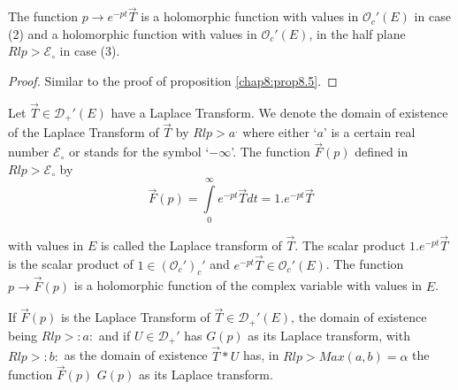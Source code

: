 \begin{prop}\label{chap9:prop9.3}
The function $p \to e^{-pt} \overrightarrow{T}$ is a holomorphic
function with values in $\mathscr{O}_c'(E)$ in case (2) and a
holomorphic function with values in $\mathscr{O}_c'(E)$, in the half
plane $Rl p > \mathscr{E}_\circ$ in case (3). 
\end{prop}

\begin{proof}
Similar to the proof of proposition \ref{chap8:prop8.5}.
\end{proof}
\setcounter{section}{9}
\setcounter{definition}{0}
\begin{definition}\label{chap9:def9.1}
Let $\overrightarrow{T} \in \mathscr{D}_+'(E)$ have a Laplace
Transform. We denote the domain of existence of the Laplace Transform
of $\overrightarrow{T}$ by $Rl p > a^.$ where either `$a$' is a
certain real number $\mathscr{E}_\circ$ or stands for the symbol
`$-\infty$'. The function $\overrightarrow{F} (p)$ defined 
in $Rl p > \mathscr{E}_\circ$ by 
$$
\overrightarrow{F}(p)=\int\limits_0^\infty e^{-pt} \overrightarrow{T}
dt = 1.e^{-pt}\overrightarrow{T}
$$
\end{definition}
with values in $E$ is called the Laplace transform of
$\overrightarrow{T}$. The scalar product $1.e^{-pt}
\overrightarrow{T}$ is the scalar product of $1 \in
(\mathscr{O}_c')_c'$ and $e^{-pt} \overrightarrow{T} \in
\mathscr{O}_c'(E)$. The function $p \to \overrightarrow{F}(p)$ is a
holomorphic function of the complex variable with values in $E$.

\begin{prop}\label{chap9:prop9.4}
If $\overrightarrow{F}(p)$ is the Laplace Transform of
$\overrightarrow{T} \in \mathscr{D}_+'(E)$, the domain of existence
being $Rl p> :a:$ and if $U \in \mathscr{D}_+'$ has $G(p)$ as
its Laplace transform, with $Rl p > :b:$ as the domain of
existence $\overrightarrow{T} * U$ has, in $Rl p> Max (a, b) =
\alpha$ the function $\overrightarrow{F}(p)$ $G(p)$ as its Laplace transform.
\end{prop}

